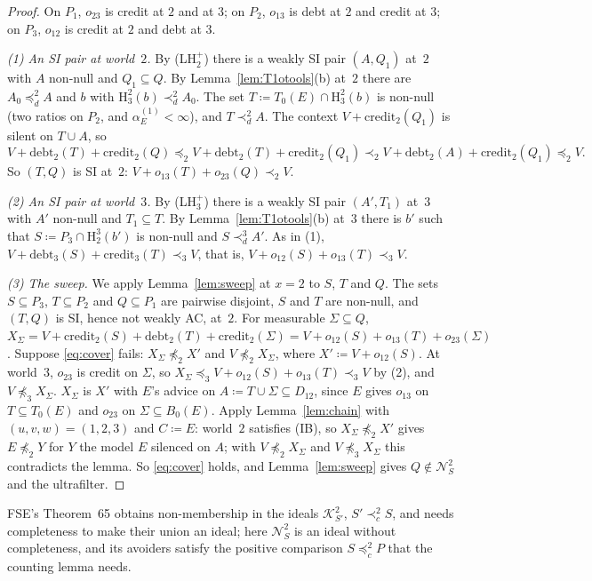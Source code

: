 \documentclass[11pt]{article}
\theoremstyle{definition}\newtheorem{definition}[theorem]{Definition}
\theoremstyle{remark}\newtheorem{remark}[theorem]{Remark}
\newcommand{\debt}{\mathrm{debt}}
\newcommand{\cred}{\mathrm{credit}}
\newcommand{\Kid}{\mathcal K}
\newcommand{\Nid}{\mathcal N}
\newcommand{\Hi}[3]{\mathrm H^{#1}_{#2}(#3)}
\begin{document}
\begin{proof}
On $P_1$, $o_{23}$ is credit at $2$ and at $3$; on $P_2$, $o_{13}$ is debt at
$2$ and credit at $3$; on $P_3$, $o_{12}$ is credit at $2$ and debt at $3$.

\emph{(1) An SI pair at world~$2$.} By (LH$^+_2$) there is a weakly SI pair
$(A,Q_1)$ at~$2$ with $A$ non-null and $Q_1\subseteq Q$. By
Lemma~\ref{lem:T1otools}(b) at~$2$ there are $A_0\preceq^2_dA$ and $b$ with
$\Hi23b\prec^2_dA_0$. The set $T\coloneqq T_0(E)\cap\Hi23b$ is non-null
(two ratios on $P_2$, and $\alpha^{(1)}_E<\infty$), and $T\prec^2_dA$. The
context $V+\cred_2(Q_1)$ is silent on $T\cup A$, so
\[
 V+\debt_2(T)+\cred_2(Q)\preceq_2V+\debt_2(T)+\cred_2(Q_1)\prec_2
 V+\debt_2(A)+\cred_2(Q_1)\preceq_2V.
\]
So $(T,Q)$ is SI at~$2$: $V+o_{13}(T)+o_{23}(Q)\prec_2V$.

\emph{(2) An SI pair at world~$3$.} By (LH$^+_3$) there is a weakly SI pair
$(A',T_1)$ at~$3$ with $A'$ non-null and $T_1\subseteq T$. By
Lemma~\ref{lem:T1otools}(b) at~$3$ there is $b'$ such that
$S\coloneqq P_3\cap\Hi32{b'}$ is non-null and $S\prec^3_dA'$. As in (1),
$V+\debt_3(S)+\cred_3(T)\prec_3V$, that is,
$V+o_{12}(S)+o_{13}(T)\prec_3V$.

\emph{(3) The sweep.} We apply Lemma~\ref{lem:sweep} at $x=2$ to $S$, $T$
and $Q$. The sets $S\subseteq P_3$, $T\subseteq P_2$ and $Q\subseteq P_1$
are pairwise disjoint, $S$ and $T$ are non-null, and $(T,Q)$ is SI, hence
not weakly AC, at~$2$. For measurable $\Sigma\subseteq Q$,
$X_\Sigma=V+\cred_2(S)+\debt_2(T)+\cred_2(\Sigma)=V+o_{12}(S)+o_{13}(T)
+o_{23}(\Sigma)$. Suppose \eqref{eq:cover} fails:
$X_\Sigma\not\preceq_2X'$ and $V\not\preceq_2X_\Sigma$, where
$X'\coloneqq V+o_{12}(S)$. At world~$3$, $o_{23}$ is credit on $\Sigma$, so
$X_\Sigma\preceq_3V+o_{12}(S)+o_{13}(T)\prec_3V$ by (2), and
$V\not\preceq_3X_\Sigma$. $X_\Sigma$ is $X'$ with $E$'s advice on
$A\coloneqq T\cup\Sigma\subseteq D_{12}$, since $E$ gives $o_{13}$ on
$T\subseteq T_0(E)$ and $o_{23}$ on $\Sigma\subseteq B_0(E)$. Apply
Lemma~\ref{lem:chain} with $(u,v,w)=(1,2,3)$ and $C\coloneqq E$: world~$2$
satisfies (IB), so $X_\Sigma\not\preceq_2X'$ gives $E\not\preceq_2Y$ for $Y$
the model $E$ silenced on $A$; with $V\not\preceq_2X_\Sigma$ and
$V\not\preceq_3X_\Sigma$ this contradicts the lemma. So \eqref{eq:cover}
holds, and Lemma~\ref{lem:sweep} gives $Q\notin\Nid^2_S$ and the
ultrafilter.
\end{proof}

FSE's Theorem~65 obtains non-membership in the ideals $\Kid^2_{S'}$,
$S'\prec^2_cS$, and needs completeness to make their union an ideal; here
$\Nid^2_S$ is an ideal without completeness, and its avoiders satisfy the
positive comparison $S\preceq^2_cP$ that the counting lemma needs.
\end{document}
